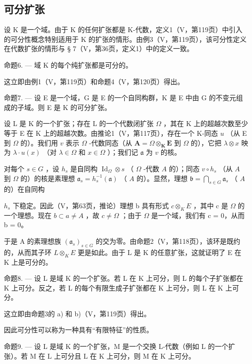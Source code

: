 \subsection{可分扩张}

设 K 是一个域。由于 K 的任何扩张都是 K-代数，定义1（V，第119页）中引入的可分性概念特别适用于 K 的扩张的情形。由例3（V，第119页），该可分性定义在代数扩张的情形与 § 7（V，第36页，定义1）中的定义一致。

命题6. --- 域 K 的每个纯扩张都是可分的。

这立即由例1（V，第119页）和命题4（V，第120页）得出。

命题7. --- 设 E 是一个域，G 是 E 的一个自同构群，K 是 E 中由 G 的不变元组成的子域。则 E 是 K 的可分扩张。

设 L 是 K 的一个扩张；存在 L 的一个代数闭扩张 \(\Omega\) ，其在 K 上的超越次数至少等于 E 在 K 上的超越次数。由推论1（V，第117页），存在一个 K-同态 \(u\) （从 E 到 \(\Omega\) 的）。我们用 \(v\) 表示 \(\Omega\) -代数同态（从 \(\mathbf{A} = \Omega \otimes_{\mathbf{K}} \mathbf{E}\) 到 \(\Omega\) 的），它把 \(\lambda \otimes x\) 映为 \(\lambda \cdot u(x)\) （对 \(\lambda \in \Omega\) 和 \(x \in \Omega\) ）；我们记 \(\mathfrak{a}\) 为 \(v\) 的核。

对每个 \(s \in G\) ，设 \(h_s\) 是自同构 \(\operatorname{Id}_{\Omega} \otimes s\) （ \(\Omega\) -代数 \(A\) 的）；同态 \(v \circ h_s\) （从 \(A\) 到 \(\Omega\) 的）的核是素理想 \(\mathfrak{a}_s = h_s^{-1}(\mathfrak{a})\) （ \(A\) 的）。显然，理想 \(\mathfrak{b} = \bigcap_{s \in G} \mathfrak{a}_s\) （ \(A\) 的）在自同构

\(h_{s}\) 下稳定。因此（V，第63页，推论）理想 b 具有形式 \(c \otimes_{K} E\) ，其中 c 是 \(\Omega\) 的一个理想。现在 \(b \subset a \neq A\) ，故 \(c \neq \Omega\) ；由于 \(\Omega\) 是一个域，我们有 c = 0，从而 b = 0。

于是 A 的素理想族 \((\mathfrak{a}_{s})_{s\in G}\) 的交为零。由命题2（V，第118页），该环是既约的，从而其子环 \(L\otimes_{K}E\) 更是如此。由于 L 是 K 的任意扩张，这就证明了 E 在 K 上是可分的。

命题8. --- 设 L 是域 K 的一个扩张。若 L 在 K 上可分，则 L 的每个子扩张都在 K 上可分。反之，若 L 的每个有限生成子扩张都在 K 上可分，则 L 在 K 上可分。

这立即由命题3的 a) 和 b)（V，第119页）得出。

因此可分性可以称为一种具有“有限特征”的性质。

命题9. --- 设 L 是域 K 的一个扩张，M 是一个交换 L-代数（例如 L 的一个扩张）。若 M 在 L 上可分且 L 在 K 上可分，则 M 在 K 上可分。

